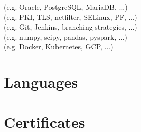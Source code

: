 \documentclass[%
               doublesided,
               paper=a4,
               fontsize=10pt
              ]{my-resume}
\begin{document}
{    \vspace{0.5em}
    
    \vspace{0.5em}
    (e.g. Oracle, PostgreSQL, MariaDB, ...)\\
    (e.g. PKI, TLS, netfilter, SELinux, PF, ...)\\
    (e.g. Git, Jenkins, branching strategies, ...)\\
    (e.g. numpy, scipy, pandas, pyspark, ...)\\
    (e.g. Docker, Kubernetes, GCP, ...)
    
    \vspace{0.5em}
    
    \section{Languages}
    \bigskip
    
    \section{Certificates}

}
\end{document}
